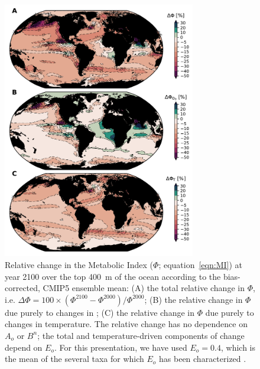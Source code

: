 \documentclass[draft,linenumbers]{report_chapter}
\begin{document}
\begin{figure}[p]
\centering
\includegraphics[width=0.75\textwidth]{metabolic-index-change-map.pdf}
\caption{Relative change in the Metabolic Index ($\Phi$; equation~\ref{eqn:MI}) at year 2100 over the top 400~m of the ocean according to the bias-corrected, CMIP5 ensemble mean:
(A) the total relative change in $\Phi$, i.e. ${\Delta\Phi = 100\times(\Phi^{2100}-\Phi^{2000})/\Phi^{2000}}$; (B) the relative change in $\Phi$ due purely to changes in ; (C) the relative change in $\Phi$ due purely to changes in temperature.
The relative change has no dependence on $A_o$ or $B^n$; the total and temperature-driven components of change depend on $E_o$.
For this presentation, we have used $E_o = 0.4$, which is the mean of the several taxa for which $E_o$ has been characterized \citep{Deutsch-Ferrel-etal-2015}.
}
\label{fig:MI-change-map}
\end{figure}
\end{document}
